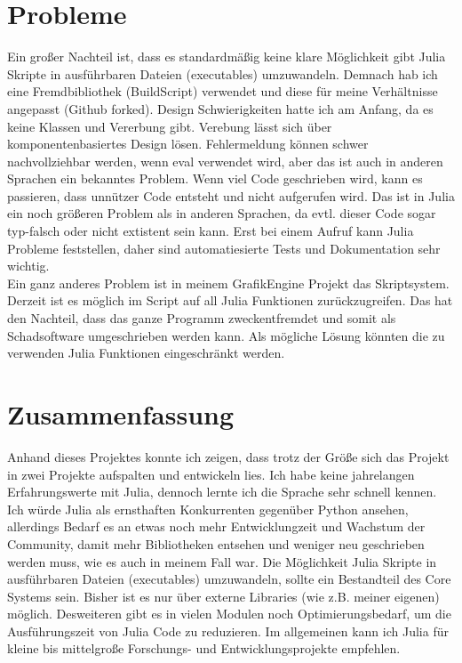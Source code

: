 \documentclass[11pt]{article}
\begin{document}
\section{Probleme}
Ein großer Nachteil ist, dass es standardmäßig keine klare Möglichkeit gibt Julia Skripte in ausführbaren Dateien (executables) umzuwandeln. Demnach hab ich eine Fremdbibliothek (BuildScript) verwendet und diese für meine Verhältnisse angepasst (Github forked). Design Schwierigkeiten hatte ich am Anfang, da es keine Klassen und Vererbung gibt. Verebung lässt sich über komponentenbasiertes Design lösen. Fehlermeldung können schwer nachvollziehbar werden, wenn eval verwendet wird, aber das ist auch in anderen Sprachen ein bekanntes Problem. Wenn viel Code geschrieben wird, kann es passieren, dass unnützer Code entsteht und nicht aufgerufen wird. Das ist in Julia ein noch größeren Problem als in anderen Sprachen, da evtl. dieser Code sogar typ-falsch oder nicht extistent sein kann. Erst bei einem Aufruf kann Julia Probleme feststellen, daher sind automatiesierte Tests und Dokumentation sehr wichtig.\\
Ein ganz anderes Problem ist in meinem GrafikEngine Projekt das Skriptsystem. Derzeit ist es möglich im Script auf all Julia Funktionen zurückzugreifen. Das hat den Nachteil, dass das ganze Programm zweckentfremdet und somit als Schadsoftware umgeschrieben werden kann. Als mögliche Lösung könnten die zu verwenden Julia Funktionen eingeschränkt werden.

\section{Zusammenfassung}
Anhand dieses Projektes konnte ich zeigen, dass trotz der Größe sich das Projekt in zwei Projekte aufspalten und entwickeln lies. Ich habe keine jahrelangen Erfahrungswerte mit Julia, dennoch lernte ich die Sprache sehr schnell kennen. Ich würde Julia als ernsthaften Konkurrenten gegenüber Python ansehen, allerdings Bedarf es an etwas noch mehr Entwicklungzeit und Wachstum der Community, damit mehr Bibliotheken entsehen und weniger neu geschrieben werden muss, wie es auch in meinem Fall war. Die Möglichkeit Julia Skripte in ausführbaren Dateien (executables) umzuwandeln, sollte ein Bestandteil des Core Systems sein. Bisher ist es nur über externe Libraries (wie z.B. meiner eigenen) möglich. Desweiteren gibt es in vielen Modulen noch Optimierungsbedarf, um die Ausführungszeit von Julia Code zu reduzieren. Im allgemeinen kann ich Julia für kleine bis mittelgroße Forschungs- und Entwicklungsprojekte empfehlen.
\end{document}
